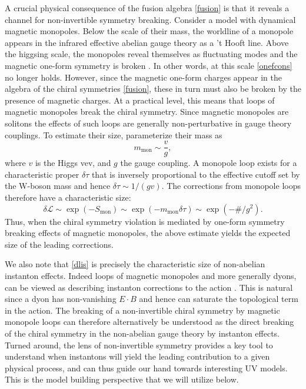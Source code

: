 \documentclass[11pt,a4paper]{article}
\begin{document}
A crucial physical consequence of the fusion algebra \eqref{fusion} is that it reveals a channel for non-invertible symmetry breaking.  Consider a model with dynamical magnetic monopoles.  Below the scale of their mass, the worldline of a monopole appears in the infrared effective abelian gauge theory as a 't Hooft line.  Above the higgsing scale, the monopoles reveal themselves as fluctuating modes and the magnetic one-form symmetry is broken \cite{Cordova:2022rer}.  In other words, at this scale \eqref{onefcons} no longer holds.  However, since the magnetic one-form charges appear in the algebra of the chiral symmetries \eqref{fusion}, these in turn must also be broken by the presence of magnetic charges.  At a practical level, this means that loops of magnetic monopoles break the chiral symmetry.  Since magnetic monopoles are solitons the effects of such loops are generally non-perturbative in gauge theory couplings. To estimate their size, parameterize their mass as
\begin{equation}
    m_\text{mon}\sim \frac{v}{g}, 
\end{equation}
where $v$ is the Higgs vev, and $g$ the gauge coupling.  A monopole loop exists for a characteristic proper $\delta \tau$ that is inversely proportional to the effective cutoff set by the W-boson mass and hence $\delta \tau \sim 1/(gv).$  The corrections from monopole loops therefore have a characteristic size:
\begin{equation}\label{dlis}
    \delta \mathcal{L}\sim \exp\left(-S_{\text{mon}}\right) \sim \exp\left(-m_{\text{mon}}\delta \tau\right)\sim \exp\left(-\#/g^{2}\right).
\end{equation}
Thus, when the chiral symmetry violation is mediated by one-form symmetry breaking effects of magnetic monopoles, the above estimate yields the expected size of the leading corrections.  

We also note that \eqref{dlis} is precisely the characteristic size of non-abelian instanton effects.  Indeed loops of magnetic monopoles and more generally dyons, can be viewed as describing instanton corrections to the action \cite{Fan:2021ntg}.  This is natural since a dyon has non-vanishing $E\cdot B$ and hence can saturate the topological term in the action.  The breaking of a non-invertible chiral symmetry by magnetic monopole loops can therefore alternatively be understood as the direct breaking of the chiral symmetry in the non-abelian gauge theory by instanton effects.  Turned around, the lens of non-invertible symmetry provides a key tool to understand when instantons will yield the leading contribution to a given physical process, and can thus guide our hand towards interesting UV models.  This is the model building perspective that we will utilize below.  
\end{document}

